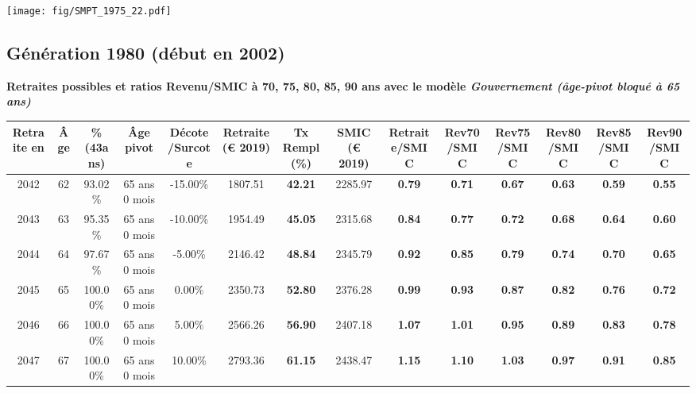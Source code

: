  \vspace{0.1cm} 

 \begin{center}\texttt{[image: fig/SMPT\_1975\_22.pdf]}\end{center} \label{fig/SMPT_1975_22.pdf} 

\newpage 
 
\subsection{Génération 1980 (début en 2002)} 

{\bf \noindent Retraites possibles et ratios Revenu/SMIC à 70, 75, 80, 85, 90 ans avec le modèle \emph{Gouvernement (âge-pivot bloqué à 65 ans)}}  
 
\begin{adjustbox}{max width=\textwidth} 
\begin{tabular}[htb]{|c|c||c|c|c||c|c||c||c|c|c|c|c|c|} 
\hline 
 Retraite en &  Âge &  \%(43ans) &  Âge pivot &  Décote/Surcote &  Retraite (\euro{} 2019) &  Tx Rempl(\%) &  SMIC (\euro{} 2019) &  Retraite/SMIC &  Rev70/SMIC &  Rev75/SMIC &  Rev80/SMIC &  Rev85/SMIC &  Rev90/SMIC \\ 
\hline \hline 
 2042 &  62 &  93.02\% &  65 ans 0 mois &  -15.00\% &  1807.51 &  {\bf 42.21} &  2285.97 &  {\bf {\color{red} 0.79}} &  {\bf {\color{red} 0.71}} &  {\bf {\color{red} 0.67}} &  {\bf {\color{red} 0.63}} &  {\bf {\color{red} 0.59}} &  {\bf {\color{red} 0.55}} \\ 
\hline 
 2043 &  63 &  95.35\% &  65 ans 0 mois &  -10.00\% &  1954.49 &  {\bf 45.05} &  2315.68 &  {\bf {\color{red} 0.84}} &  {\bf {\color{red} 0.77}} &  {\bf {\color{red} 0.72}} &  {\bf {\color{red} 0.68}} &  {\bf {\color{red} 0.64}} &  {\bf {\color{red} 0.60}} \\ 
\hline 
 2044 &  64 &  97.67\% &  65 ans 0 mois &  -5.00\% &  2146.42 &  {\bf 48.84} &  2345.79 &  {\bf {\color{red} 0.92}} &  {\bf {\color{red} 0.85}} &  {\bf {\color{red} 0.79}} &  {\bf {\color{red} 0.74}} &  {\bf {\color{red} 0.70}} &  {\bf {\color{red} 0.65}} \\ 
\hline 
 2045 &  65 &  100.00\% &  65 ans 0 mois &  0.00\% &  2350.73 &  {\bf 52.80} &  2376.28 &  {\bf {\color{red} 0.99}} &  {\bf {\color{red} 0.93}} &  {\bf {\color{red} 0.87}} &  {\bf {\color{red} 0.82}} &  {\bf {\color{red} 0.76}} &  {\bf {\color{red} 0.72}} \\ 
\hline 
 2046 &  66 &  100.00\% &  65 ans 0 mois &  5.00\% &  2566.26 &  {\bf 56.90} &  2407.18 &  {\bf 1.07} &  {\bf 1.01} &  {\bf {\color{red} 0.95}} &  {\bf {\color{red} 0.89}} &  {\bf {\color{red} 0.83}} &  {\bf {\color{red} 0.78}} \\ 
\hline 
 2047 &  67 &  100.00\% &  65 ans 0 mois &  10.00\% &  2793.36 &  {\bf 61.15} &  2438.47 &  {\bf 1.15} &  {\bf 1.10} &  {\bf 1.03} &  {\bf {\color{red} 0.97}} &  {\bf {\color{red} 0.91}} &  {\bf {\color{red} 0.85}} \\ 
\hline 
\hline 
\end{tabular} 
\end{adjustbox} 
 
